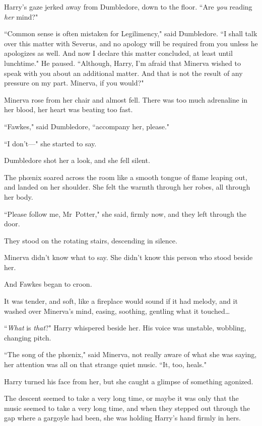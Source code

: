 Harry's gaze jerked away from Dumbledore, down to the floor. ``Are \emph{you} reading \emph{her} mind?"

``Common sense is often mistaken for Legilimency," said Dumbledore. ``I shall talk over this matter with Severus, and no apology will be required from you unless he apologizes as well. And now I declare this matter concluded, at least until lunchtime." He paused. ``Although, Harry, I'm afraid that Minerva wished to speak with you about an additional matter. And that is not the result of any pressure on my part. Minerva, if you would?"

Minerva rose from her chair and almost fell. There was too much adrenaline in her blood, her heart was beating too fast.

``Fawkes," said Dumbledore, ``accompany her, please."

``I don't—" she started to say.

Dumbledore shot her a look, and she fell silent.

The phœnix soared across the room like a smooth tongue of flame leaping out, and landed on her shoulder. She felt the warmth through her robes, all through her body.

``Please follow me, Mr~Potter," she said, firmly now, and they left through the door.

\later

They stood on the rotating stairs, descending in silence.

Minerva didn't know what to say. She didn't know this person who stood beside her.

And Fawkes began to croon.

It was tender, and soft, like a fireplace would sound if it had melody, and it washed over Minerva's mind, easing, soothing, gentling what it touched…

``\emph{What} is \emph{that}?" Harry whispered beside her. His voice was unstable, wobbling, changing pitch.

``The song of the phœnix," said Minerva, not really aware of what she was saying, her attention was all on that strange quiet music. ``It, too, heals."

Harry turned his face from her, but she caught a glimpse of something agonized.

The descent seemed to take a very long time, or maybe it was only that the music seemed to take a very long time, and when they stepped out through the gap where a gargoyle had been, she was holding Harry's hand firmly in hers.

